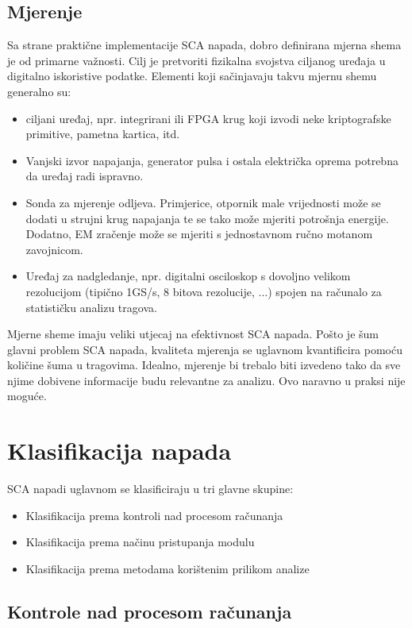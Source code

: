 \documentclass[times, utf8, diplomski]{fer}
\begin{document}
\subsection{Mjerenje}
Sa strane praktične implementacije SCA napada, dobro definirana mjerna shema je od primarne važnosti. Cilj je pretvoriti fizikalna svojstva ciljanog uređaja u digitalno iskoristive podatke. Elementi koji sačinjavaju takvu mjernu shemu generalno su:
\begin{itemize}
    \item ciljani uređaj, npr. integrirani ili FPGA krug koji izvodi neke kriptografske primitive, pametna kartica, itd.
    \item Vanjski izvor napajanja, generator pulsa i ostala električka oprema potrebna da uređaj radi ispravno.
    \item Sonda za mjerenje odljeva. Primjerice, otpornik male vrijednosti može se dodati u strujni krug napajanja te se tako može mjeriti potrošnja energije. Dodatno, EM zračenje može se mjeriti s jednostavnom ručno motanom zavojnicom.
    \item Uređaj za nadgledanje, npr. digitalni osciloskop s dovoljno velikom rezolucijom (tipično 1GS/s, 8 bitova rezolucije, ...) spojen na računalo za statističku analizu tragova.
\end{itemize}

Mjerne sheme imaju veliki utjecaj na efektivnost SCA napada. Pošto je šum glavni problem SCA napada, kvaliteta mjerenja se uglavnom kvantificira pomoću količine šuma u tragovima. Idealno, mjerenje bi trebalo biti izvedeno tako da sve njime dobivene informacije budu relevantne za analizu. Ovo naravno u praksi nije moguće.

\section{Klasifikacija napada} \label{sec:attacks}

SCA napadi uglavnom se klasificiraju u tri glavne skupine:

\begin{itemize}
    \item Klasifikacija prema kontroli nad procesom računanja
    \item Klasifikacija prema načinu pristupanja modulu
    \item Klasifikacija prema metodama korištenim prilikom analize
\end{itemize}

\subsection{Kontrole nad procesom računanja}
\end{document}
